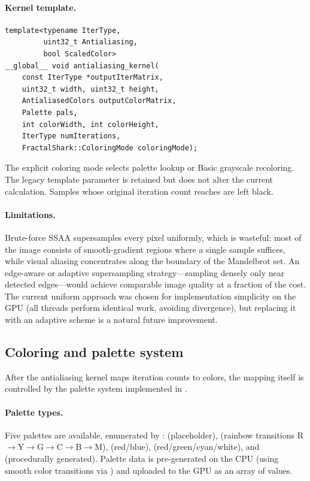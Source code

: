 \paragraph{Kernel template.}
\begin{lstlisting}
template<typename IterType,
         uint32_t Antialiasing,
         bool ScaledColor>
__global__ void antialiasing_kernel(
    const IterType *outputIterMatrix,
    uint32_t width, uint32_t height,
    AntialiasedColors outputColorMatrix,
    Palette pals,
    int colorWidth, int colorHeight,
    IterType numIterations,
    FractalShark::ColoringMode coloringMode);
\end{lstlisting}
The explicit coloring mode selects palette lookup or Basic grayscale
recoloring. The legacy  template parameter is retained
but does not alter the current calculation. Samples whose original
iteration count reaches  are left black.

\paragraph{Limitations.}
Brute-force SSAA supersamples every pixel uniformly, which is
wasteful: most of the image consists of smooth-gradient regions where
a single sample suffices, while visual aliasing concentrates along the
boundary of the Mandelbrot set.  An edge-aware or adaptive
supersampling strategy---sampling densely only near detected
edges---would achieve comparable image quality at a fraction of the
cost.  The current uniform approach was chosen for implementation
simplicity on the GPU (all threads perform identical work, avoiding
divergence), but replacing it with an adaptive scheme is a natural
future improvement.

\subsection{Coloring and palette system}
\label{subsec:coloring}

After the antialiasing kernel maps iteration counts to colors, the
mapping itself is controlled by the palette system implemented in
.

\paragraph{Palette types.}
Five palettes are available, enumerated by
:
 (placeholder),
 (rainbow transitions R$\to$Y$\to$G$\to$C$\to$B$\to$M),
 (red/blue),
 (red/green/cyan/white), and
 (procedurally generated).
Palette data is pre-generated on the CPU (using smooth color
transitions via ) and uploaded to the GPU as an
array of  values.

